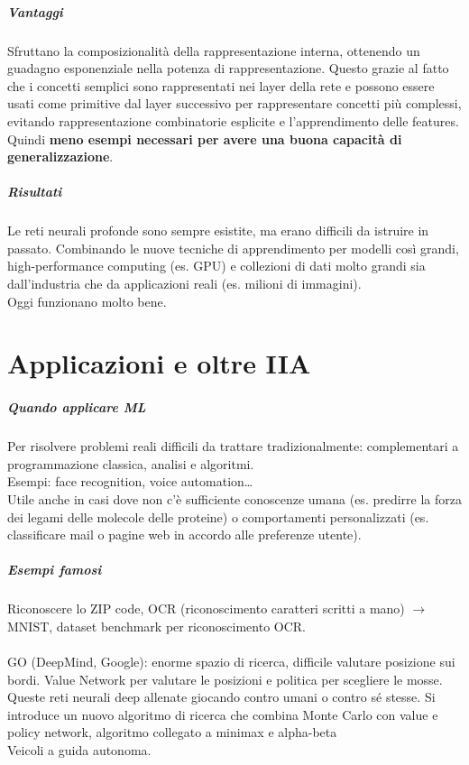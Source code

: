 \documentclass[10pt]{book}
\begin{document}
\paragraph{Vantaggi} Sfruttano la composizionalità della rappresentazione interna, ottenendo un guadagno esponenziale nella potenza di rappresentazione. Questo grazie al fatto che i concetti semplici sono rappresentati nei layer della rete e possono essere usati come primitive dal layer successivo per rappresentare concetti più complessi, evitando rappresentazione combinatorie esplicite e l'apprendimento delle features.\\
Quindi \textbf{meno esempi necessari per avere una buona capacità di generalizzazione}.
\paragraph{Risultati} Le reti neurali profonde sono sempre esistite, ma erano difficili da istruire in passato. Combinando le nuove tecniche di apprendimento per modelli così grandi, high-performance computing (es. GPU) e collezioni di dati molto grandi sia dall'industria che da applicazioni reali (es. milioni di immagini).\\
Oggi funzionano molto bene.
\chapter{Applicazioni e oltre IIA}
\paragraph{Quando applicare ML} Per risolvere problemi reali difficili da trattare tradizionalmente: complementari a programmazione classica, analisi e algoritmi.\\
Esempi: face recognition, voice automation\ldots\\
Utile anche in casi dove non c'è sufficiente conoscenze umana (es. predirre la forza dei legami delle molecole delle proteine) o comportamenti personalizzati (es. classificare mail o pagine web in accordo alle preferenze utente).
\paragraph{Esempi famosi} Riconoscere lo ZIP code, OCR (riconoscimento caratteri scritti a mano) $\rightarrow$ MNIST, dataset benchmark per riconoscimento OCR.\\\\
GO (DeepMind, Google): enorme spazio di ricerca, difficile valutare posizione sui bordi. Value Network per valutare le posizioni e politica per scegliere le mosse. Queste reti neurali deep allenate giocando contro umani o contro sé stesse. Si introduce un nuovo algoritmo di ricerca che combina Monte Carlo con value e policy network, algoritmo collegato a minimax e alpha-beta\\
Veicoli a guida autonoma.
\end{document}
